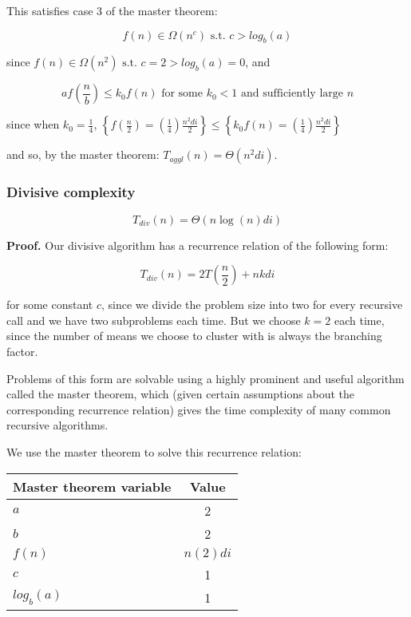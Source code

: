 \documentclass[../tech_report_1.tex]{subfiles}
\begin{document}
This satisfies case 3 of the master theorem:

$$ f(n) \in \Omega(n^c) \text{ s.t. } c > log_b(a) $$

since $f(n) \in \Omega(n^2) \text{ s.t. } c = 2 > log_b(a) = 0$, and

$$ af(\frac{n}{b}) \leq k_0 f(n) \text{ for some } k_0 < 1 \text{ and sufficiently large } n$$

since when  $k_0 = \frac{1}{4}$, $\left\{f(\frac{n}{2}) = (\frac{1}{4}) \frac{n^2di}{2}\right\} \leq \left\{k_0f(n) = (\frac{1}{4}) \frac{n^2di}{2}\right\}$

and so, by the master theorem: $ T_{aggl}(n) = \Theta(n^2di)$. \qedsymbol


\subsubsection{Divisive complexity}

\begin{theorem} $$ T_{div}(n) = \Theta(n\log(n)di) $$ \end{theorem}

\textbf{Proof.} Our divisive algorithm has a recurrence relation of the following form:

$$ T_{div}(n) = 2T(\frac{n}{2}) + nkdi $$

for some constant $c$, since we divide the problem size into two for every recursive call and we have two subproblems each time. But we choose $k=2$ each time, since the number of means we choose to cluster with is always the branching factor.

Problems of this form are solvable using a highly prominent and useful algorithm called the master theorem\cite{thomas2001introduction}, which (given certain assumptions about the corresponding recurrence relation) gives the time complexity of many common recursive algorithms.

We use the master theorem to solve this recurrence relation:

\begin{table}[ht]
\centering
\begin{tabular}{l || c }
\hline
\textbf{Master theorem variable} & \textbf{Value} \\
\hline
$a$ & 2 \\
$b$ & 2 \\
$f(n)$ & ${n(2)di}$ \\
$c$ & 1 \\
$log_b(a)$ & 1 \\
\hline
\end{tabular}
\end{table}
\end{document}
